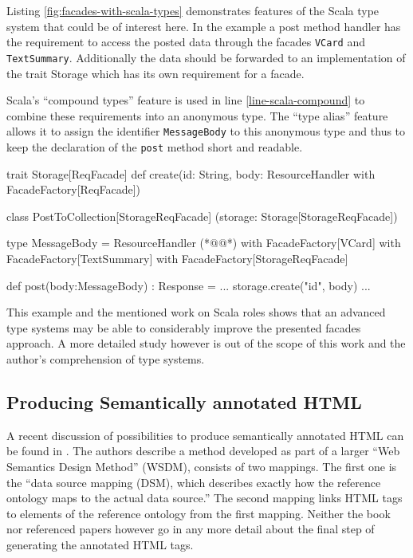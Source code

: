 \documentclass[12pt,a4paper,twoside]{scrartcl}		%
\begin{document}
Listing \ref{fig:facades-with-scala-types} demonstrates features of the Scala
type system\cite{Odersky2011} that could be of interest here. In the example a
post method handler has the requirement to access the posted data through the
facades \lstinline:VCard: and \lstinline:TextSummary:. Additionally the data
should be forwarded to an implementation of the trait Storage which has its own
requirement for a facade.

Scala's ``compound types'' feature is used in line \ref{line-scala-compound} to
combine these requirements into an anonymous type. The ``type alias'' feature
allows it to assign the identifier \lstinline:MessageBody: to this anonymous
type and thus to keep the declaration of the \lstinline:post: method short and
readable.

\begin{javalisting}[label=fig:facades-with-scala-types,
                   numbers=left,
                   escapeinside={(*@}{@*)},
                   caption={Implementing the facades approach with Scala's type system}]
trait Storage[ReqFacade] {
 def create(id: String,
            body: ResourceHandler with FacadeFactory[ReqFacade])
}

class PostToCollection[StorageReqFacade]
            (storage: Storage[StorageReqFacade]) {
 type MessageBody = ResourceHandler (*@\label{line-scala-compound}@*)
                      with FacadeFactory[VCard] 
                      with FacadeFactory[TextSummary]
                      with FacadeFactory[StorageReqFacade]
  
 def post(body:MessageBody) : Response = {
  ...
  storage.create("id", body)
  ...
 }
}
\end{javalisting}

This example and the mentioned work on Scala roles shows that an advanced type
systems may be able to considerably improve the presented facades approach. A
more detailed study however is out of the scope of this work and the author's
comprehension of type systems.


\subsection{Producing Semantically annotated HTML}

A recent discussion of possibilities to produce semantically annotated HTML can
be found in \cite[sec. 9.1.3]{DBLP:books/daglib/0023755}. The authors describe a
method developed as part of a larger ``Web Semantics Design Method'' (WSDM),
consists of two mappings. The first one is the ``data source mapping (DSM),
which describes exactly how the reference ontology maps to the actual data
source.''  The second mapping links HTML tags to elements of the reference
ontology from the first mapping. Neither the book nor referenced papers however
go in any more detail about the final step of generating the annotated HTML
tags.
\end{document}
